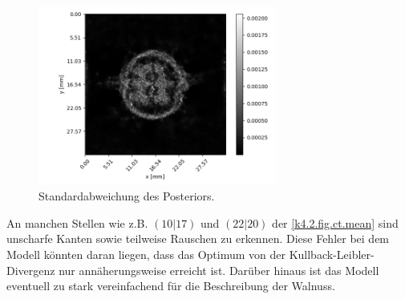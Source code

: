 \begin{figure}
  \centering
  \includegraphics[width=0.7\textwidth]{k4.2/ct-walnuss-std.png}
  \caption{Standardabweichung des Posteriors.}
  \label{k4.2.fig.ct.std}
\end{figure}

An manchen Stellen wie z.B. $(10|17)$ und $(22|20)$ der \cref{k4.2.fig.ct.mean} sind unscharfe Kanten sowie teilweise Rauschen zu erkennen. Diese Fehler bei dem Modell könnten daran liegen, dass das Optimum von der Kullback-Leibler-Divergenz nur annäherungsweise erreicht ist. Darüber hinaus ist das Modell eventuell zu stark vereinfachend für die Beschreibung der Walnuss. 
